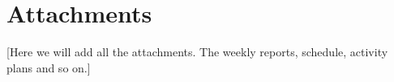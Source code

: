 \section{Attachments}\label{Attachments} 

    [Here we will add all the attachments. The weekly reports, schedule, activity plans and so on.]

